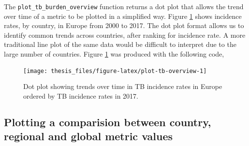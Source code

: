 \documentclass[11pt,twoside]{bristolthesis}
\begin{document}
  The \texttt{plot\_tb\_burden\_overview} function returns a dot plot that allows the trend over time of a metric to be plotted in a simplified way. Figure \ref{fig:plot-tb-overview} shows incidence rates, by country, in Europe from 2000 to 2017. The dot plot format allows us to identify common trends across countries, after ranking for incidence rate. A more traditional line plot of the same data would be difficult to interpret due to the large number of countries. Figure \ref{fig:plot-tb-overview} was produced with the following code,
  \begin{Shaded}
  \begin{Highlighting}[]
  \NormalTok{(} \NormalTok{,}
                           \NormalTok{,}
                           \NormalTok{,}
                           \NormalTok{,}
                           \NormalTok{)}
  \end{Highlighting}
  \end{Shaded}
  \begin{figure}
  
  {\centering \texttt{[image: thesis\_files/figure-latex/plot-tb-overview-1]} 
  
  }
  
  \caption{Dot plot showing trends over time in TB incidence rates in Europe ordered by TB incidence rates in 2017. }\label{fig:plot-tb-overview}
  \end{figure}
  \hypertarget{gettbinr-plot-sum}{%
  \subsection{Plotting a comparision between country, regional and global metric values}\label{gettbinr-plot-sum}}
  
\end{document}
